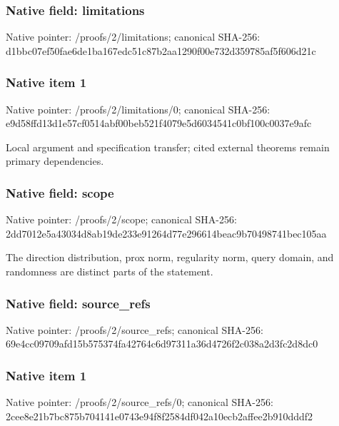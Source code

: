 \documentclass[10pt,a4paper]{article}
\begin{document}
\subsubsection{Native field: limitations}


Native pointer: /proofs/2/limitations; canonical SHA-256: d1bbc07ef50fae6de1ba167e\allowbreak{}dc51c87b2aa1290f00e732d3\allowbreak{}59785af5f606d21c



\subsubsection{Native item 1}


Native pointer: /proofs/2/limitations/0; canonical SHA-256: e9d58ffd13d1e57cf0514abf\allowbreak{}00beb521f4079e5d6034541c\allowbreak{}0bf100c0037e9afc


Local argument and specification transfer; cited external theorems remain primary dependencies.


\subsubsection{Native field: scope}


Native pointer: /proofs/2/scope; canonical SHA-256: 2dd7012e5a43034d8ab19de2\allowbreak{}33e91264d77e296614beac9b\allowbreak{}70498741bec105aa


The direction distribution, prox norm, regularity norm, query domain, and randomness are distinct parts of the statement.


\subsubsection{Native field: source\_refs}


Native pointer: /proofs/2/source\_refs; canonical SHA-256: 69e4cc09709afd15b575374f\allowbreak{}a42764c6d97311a36d4726f2\allowbreak{}c038a2d3fc2d8dc0



\subsubsection{Native item 1}


Native pointer: /proofs/2/source\_refs/0; canonical SHA-256: 2cee8e21b7bc875b704141e0\allowbreak{}743e94f8f2584df042a10ecb\allowbreak{}2affee2b910dddf2
\end{document}
